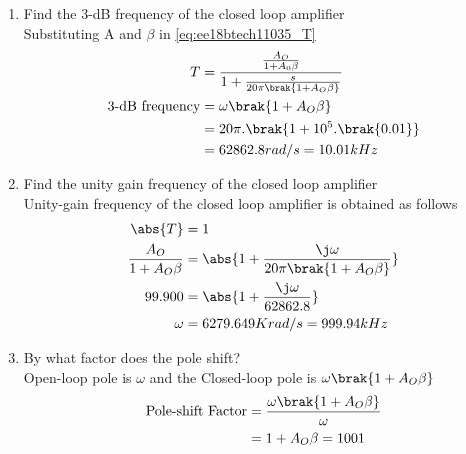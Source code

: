 \begin{enumerate}[label=\thesubsection.\arabic*.,ref=\thesubsection.\theenumi]
\item Find the 3-dB frequency of the closed loop amplifier\\
\solution Substituting A and $\beta$ in \eqref{eq:ee18btech11035_T}
\begin{align}
    T&=\frac{\frac{A_{O}}{1+A_{0}\beta}}{1+\frac{s}{20\pi\brak{1+A_{O}\beta}}}\\
    \text{3-dB frequency}&=\omega\brak{1+A_{O}\beta}\\
    &=20\pi.\brak{1+10^5.\brak{0.01}}\\
    &=62862.8rad/s=10.01kHz
\end{align}

\item Find the unity gain frequency of the closed loop amplifier\\
\solution Unity-gain frequency of the closed loop amplifier is obtained as follows
\begin{align}
    \abs{T}&=1\\
    \frac{A_{O}}{1+A_{O}\beta}&=\abs{1+\frac{\j\omega}{20\pi\brak{1+A_{O}\beta}}}\\
    99.900&=\abs{1+\frac{\j\omega}{62862.8}}\\
    \omega&=6279.649Krad/s=999.94kHz
\end{align}
\item By what factor does the pole shift?\\
\solution Open-loop pole is $\omega$ and the Closed-loop pole is $\omega\brak{1+A_{O}\beta}$\\
\begin{align}
    \text{Pole-shift Factor}&=\frac{\omega\brak{1+A_{O}\beta}}{\omega}\\
    &=1+A_{O}\beta=1001
\end{align}


\end{enumerate}
